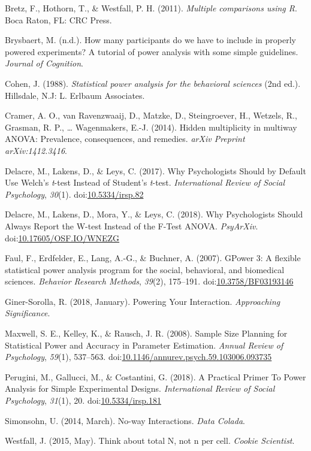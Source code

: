 \documentclass[,jou, draftfirst, a4paper,floatsintext]{apa6}
\begin{document}
\leavevmode\hypertarget{ref-bretz_multiple_2011}{}%
Bretz, F., Hothorn, T., \& Westfall, P. H. (2011). \emph{Multiple comparisons using R}. Boca Raton, FL: CRC Press.

\leavevmode\hypertarget{ref-brysbaert_how_nodate}{}%
Brysbaert, M. (n.d.). How many participants do we have to include in properly powered experiments? A tutorial of power analysis with some simple guidelines. \emph{Journal of Cognition}.

\leavevmode\hypertarget{ref-cohen_statistical_1988}{}%
Cohen, J. (1988). \emph{Statistical power analysis for the behavioral sciences} (2nd ed.). Hillsdale, N.J: L. Erlbaum Associates.

\leavevmode\hypertarget{ref-cramer_hidden_2014}{}%
Cramer, A. O., van Ravenzwaaij, D., Matzke, D., Steingroever, H., Wetzels, R., Grasman, R. P., \ldots{} Wagenmakers, E.-J. (2014). Hidden multiplicity in multiway ANOVA: Prevalence, consequences, and remedies. \emph{arXiv Preprint arXiv:1412.3416}.

\leavevmode\hypertarget{ref-delacre_why_2017}{}%
Delacre, M., Lakens, D., \& Leys, C. (2017). Why Psychologists Should by Default Use Welch's \emph{t}-test Instead of Student's \emph{t}-test. \emph{International Review of Social Psychology}, \emph{30}(1). doi:\href{https://doi.org/10.5334/irsp.82}{10.5334/irsp.82}

\leavevmode\hypertarget{ref-delacre_why_2018}{}%
Delacre, M., Lakens, D., Mora, Y., \& Leys, C. (2018). Why Psychologists Should Always Report the W-test Instead of the F-Test ANOVA. \emph{PsyArXiv}. doi:\href{https://doi.org/10.17605/OSF.IO/WNEZG}{10.17605/OSF.IO/WNEZG}

\leavevmode\hypertarget{ref-faul_gpower_2007}{}%
Faul, F., Erdfelder, E., Lang, A.-G., \& Buchner, A. (2007). GPower 3: A flexible statistical power analysis program for the social, behavioral, and biomedical sciences. \emph{Behavior Research Methods}, \emph{39}(2), 175--191. doi:\href{https://doi.org/10.3758/BF03193146}{10.3758/BF03193146}

\leavevmode\hypertarget{ref-giner-sorolla_powering_2018}{}%
Giner-Sorolla, R. (2018, January). Powering Your Interaction. \emph{Approaching Significance}.

\leavevmode\hypertarget{ref-maxwell_sample_2008}{}%
Maxwell, S. E., Kelley, K., \& Rausch, J. R. (2008). Sample Size Planning for Statistical Power and Accuracy in Parameter Estimation. \emph{Annual Review of Psychology}, \emph{59}(1), 537--563. doi:\href{https://doi.org/10.1146/annurev.psych.59.103006.093735}{10.1146/annurev.psych.59.103006.093735}

\leavevmode\hypertarget{ref-perugini_practical_2018}{}%
Perugini, M., Gallucci, M., \& Costantini, G. (2018). A Practical Primer To Power Analysis for Simple Experimental Designs. \emph{International Review of Social Psychology}, \emph{31}(1), 20. doi:\href{https://doi.org/10.5334/irsp.181}{10.5334/irsp.181}

\leavevmode\hypertarget{ref-simonsohn_no-way_2014}{}%
Simonsohn, U. (2014, March). No-way Interactions. \emph{Data Colada}.

\leavevmode\hypertarget{ref-westfall_think_2015}{}%
Westfall, J. (2015, May). Think about total N, not n per cell. \emph{Cookie Scientist}.
\end{document}
